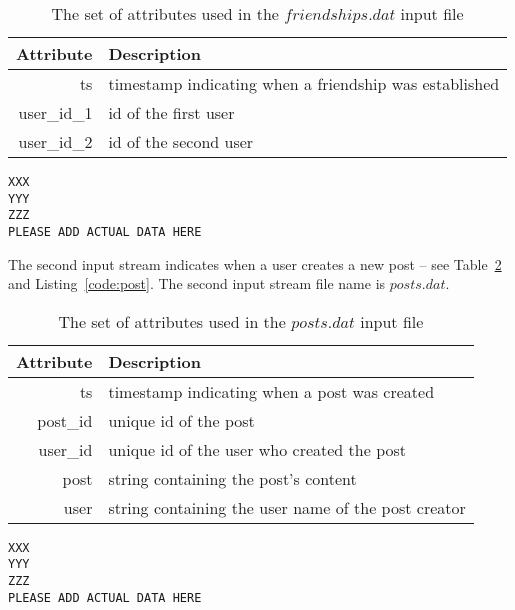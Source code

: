 \documentclass{sig-alternate}
\begin{document}
\begin{table}[ht]
	\caption{The set of attributes used in the $friendships.dat$ input file}
	\centering 
	\begin{tabular}{r p{5.2cm}}
		\toprule
		Attribute		&	 Description\\
		\midrule
		ts			&	timestamp indicating when a friendship was established\\[2ex]
		user\_id\_1	&	id of the first user\\[2ex]
		user\_id\_2	&	id of the second user\\[2ex]		
		\bottomrule 
	\end{tabular}
	\label{table:friend}
\end{table}



\lstset{}
\begin{lstlisting}[float=ht,caption={First line from the $friendships.dat$ file -- one attribute per line of listing},label={code:friend}]
XXX
YYY
ZZZ
PLEASE ADD ACTUAL DATA HERE
\end{lstlisting}	

The second input stream indicates when a user creates a new post -- see Table~\ref{table:post} and Listing~\ref{code:post}. The second input stream file name is $posts.dat$.

\begin{table}[ht]
	\caption{The set of attributes used in the $posts.dat$ input file}
	\centering 
	\begin{tabular}{r p{5.2cm}}
		\toprule
		Attribute		&	 Description\\
		\midrule
		ts			&	timestamp indicating when a post was created\\[2ex]
		post\_id	&	unique id of the post\\[2ex]
		user\_id	&	unique id of the user who created the post\\[2ex]		
		post		& 	string containing the post's content\\[2ex]		
		user		&   string containing the user name of the post creator\\[2ex]
		\bottomrule 
	\end{tabular}
	\label{table:post}
\end{table}



\lstset{}
\begin{lstlisting}[float=ht,caption={First line from the $posts.dat$ file -- one attribute per line of listing},label={code:post}]
XXX
YYY
ZZZ
PLEASE ADD ACTUAL DATA HERE
\end{lstlisting}
\end{document}
